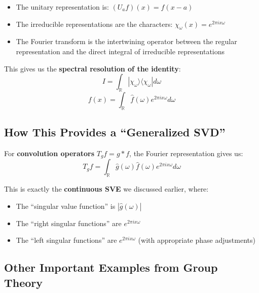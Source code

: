 \documentclass[aps,prl,reprint]{revtex4-2}
\begin{document}
\begin{itemize}
\item The unitary representation is: $(U_a f)(x) = f(x - a)$

\item The irreducible representations are the characters: $\chi_\omega(x) =
e^{2\pi i x\omega}$

\item The Fourier transform is the intertwining operator between the regular
representation and the direct integral of irreducible representations
\end{itemize}

This gives us the \textbf{spectral resolution of the identity}: 
\begin{equation*}
I = \int_{\mathbb{R}} |\chi_\omega\rangle\langle\chi_\omega| d\omega 
\end{equation*}
\begin{equation*}
f(x) = \int_{\mathbb{R}} \hat{f}(\omega) e^{2\pi i x\omega} d\omega 
\end{equation*}

\subsection*{How This Provides a ``Generalized SVD''}

For \textbf{convolution operators} $T_g f = g * f$, the Fourier
representation gives us: 
\begin{equation*}
T_g f = \int_{\mathbb{R}} \hat{g}(\omega)\hat{f}(\omega) e^{2\pi i x\omega}
d\omega 
\end{equation*}

This is exactly the \textbf{continuous SVE} we discussed earlier, where:

\begin{itemize}
\item The ``singular value function'' is $|\hat{g}(\omega)|$

\item The ``right singular functions'' are $e^{2\pi i x\omega}$

\item The ``left singular functions'' are $e^{2\pi i x\omega}$ (with
appropriate phase adjustments)
\end{itemize}

\subsection*{Other Important Examples from Group Theory}
\end{document}
